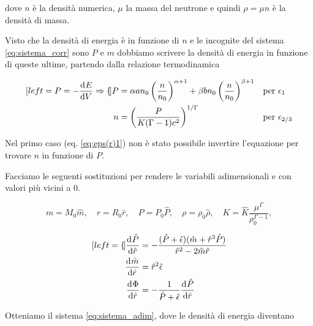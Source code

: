 \documentclass[a4paper, titlepage]{article}
\begin{document}
dove $n$ è la densità numerica, $\mu$ la massa del neutrone e quindi
$\rho = \mu n$ è la densità di massa.

Visto che la densità di energia è in funzione di $n$ e le incognite del
sistema \ref{eq:sistema_corr} sono $P$ e $m$ dobbiamo scrivere la densità di
energia in funzione di queste ultime, partendo dalla relazione termodinamica

\begin{subequations}
    \label{eq:eps(r)}
    \begin{align}[left = {P = - \dv[]{E}{V} \Rightarrow \empheqlbrace}]
        P &= \alpha a n_0 \left( \frac{n}{n_0} \right)^{\alpha + 1}
        + \beta b n_0 \left( \frac{n}{n_0} \right)^{\beta + 1}
        && \text{per } \epsilon_1 \label{eq:eps(r)1} \\
        n &= \left( \frac{P}{K(\Gamma - 1) c^2} \right)^{1 / \Gamma}
        && \text{per } \epsilon_{2/3} \label{eq:eps(r)23}
    \end{align}
\end{subequations}

Nel primo caso (eq. \ref{eq:eps(r)1}) non è stato possibile invertire
l'equazione per trovare $n$ in funzione di $P$.

Facciamo le seguenti sostituzioni per rendere le variabili adimensionali e con
valori più vicini a 0.

\begin{equation*}
    m=M_0\hat m, \quad 
    r=R_0\hat r, \quad 
    P=P_0\hat P, \quad
    \rho=\rho_0 \hat{\rho}, \quad
    K = \hat{K}\frac{\mu^\Gamma}{\rho_0^{\Gamma-1}},
\end{equation*}

\begin{subequations}
    \begin{align}[left = {\empheqlbrace}]
        \dv[]{\hat P}{\hat r} &=
        - \frac{(\hat P + \hat{\epsilon})(\hat m + \hat r^3 \hat P)}
        {\hat r^2-2\hat m\hat r} \label{eq:P_ad} \\
        \dv[]{\hat m}{\hat r} &= \hat r^2 \hat{\epsilon} \label{eq:m_ad} \\
        \dv[]{\Phi}{\hat r} &= - \frac{1}{\hat P + \hat{\epsilon}}
        \dv[]{\hat P}{\hat r} \label{eq:Phi_ad}
    \end{align}
    \label{eq:sistema_adim}
\end{subequations}

Otteniamo il sistema \ref{eq:sistema_adim}, dove le densità di energia diventano
\end{document}

